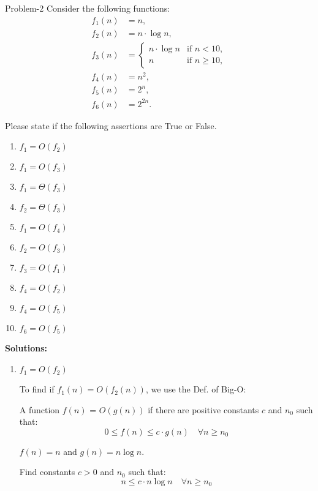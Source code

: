 \begin{problem}{}{Problem-2}
	Consider the following functions:
	\[
	\begin{aligned}
		f_1(n) &= n, \\
		f_2(n) &= n \cdot \log n, \\
		f_3(n) &= 
		\begin{cases} 
			n \cdot \log n & \text{if } n < 10, \\
			n & \text{if } n \geq 10, 
		\end{cases} \\
		f_4(n) &= n^2, \\
		f_5(n) &= 2^n, \\
		f_6(n) &= 2^{2n}.
	\end{aligned}
	\]
	
	Please state if the following assertions are True or False.
	\begin{enumerate}[label=(\alph*)]
        \item $f_1 = O(f_2)$
\item $f_1 = O(f_3)$
\item $f_1 = \Theta(f_3)$
\item $f_2 = \Theta(f_3)$
\item $f_1 = O(f_4)$
\item $f_2 = O(f_3)$
\item $f_3 = O(f_1)$
\item $f_4 = O(f_2)$
\item $f_4 = O(f_5)$
\item $f_6 = O(f_5)$
	\end{enumerate}
	
	\vspace{0.5em} %
	
	\textbf{Solutions:}
	
	\begin{enumerate}[label=(\alph*)]
		\item \textbf{\(f_1 = O(f_2)\) }
		
		To find if \(f_1(n) = O(f_2(n))\), we use the Def. of Big-O:
		
		A function \(f(n)\) = \(O(g(n))\) if there are positive constants \(c\) and \(n_0\) such that:
		\[
		0 \leq f(n) \leq c \cdot g(n) \quad \forall n \geq n_0
		\]
		
		\(f(n) = n\) and \(g(n) = n \log n\).
		
		Find constants \(c > 0\) and \(n_0\) such that:
		\[
		n \leq c \cdot n \log n \quad \forall n \geq n_0
		\]
		

\end{enumerate}
\end{problem}
